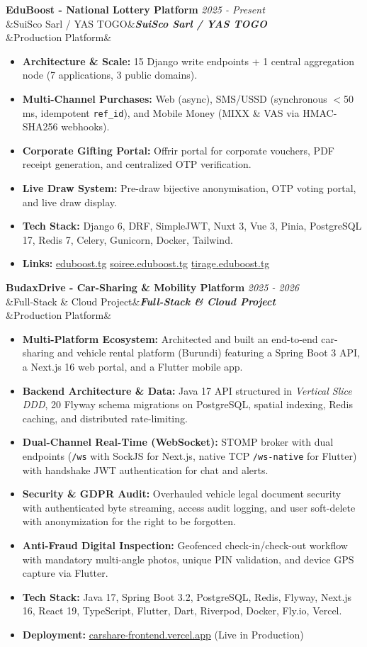 \documentclass[11pt, a4paper]{article}
\newcommand{\cventry}[4]{%
  \needspace{3\baselineskip}%
  \noindent\textbf{\large #1} \hfill {\small\color{secondary}\textit{#2}}\\[2pt]%
  \ifx&#3&\else\noindent\textbf{\textit{#3}}\\[3pt]\fi
  \ifx&#4&\else\noindent{#4}\fi
  \vspace{6pt}\par
}
\begin{document}
\cventry{EduBoost - National Lottery Platform}{2025 - Present}{SuiSco Sarl / YAS TOGO}{Production Platform}
\begin{itemize}
  \item \textbf{Architecture \& Scale:} 15 Django write endpoints + 1 central aggregation node (7 applications, 3 public domains).
  \item \textbf{Multi-Channel Purchases:} Web (async), SMS/USSD (synchronous $<$50 ms, idempotent \texttt{ref\_id}), and Mobile Money (MIXX \& VAS via HMAC-SHA256 webhooks).
  \item \textbf{Corporate Gifting Portal:} Offrir portal for corporate vouchers, PDF receipt generation, and centralized OTP verification.
  \item \textbf{Live Draw System:} Pre-draw bijective anonymisation, OTP voting portal, and live draw display.
  \item \textbf{Tech Stack:} Django 6, DRF, SimpleJWT, Nuxt 3, Vue 3, Pinia, PostgreSQL 17, Redis 7, Celery, Gunicorn, Docker, Tailwind.
  \item \textbf{Links:} \href{https://www.eduboost.tg}{eduboost.tg} \quad\textbullet\quad \href{https://soiree.eduboost.tg}{soiree.eduboost.tg} \quad\textbullet\quad \href{https://tirage.eduboost.tg}{tirage.eduboost.tg}
\end{itemize}

\vspace{4pt}

\cventry{BudaxDrive - Car-Sharing \& Mobility Platform}{2025 - 2026}{Full-Stack \& Cloud Project}{Production Platform}
\begin{itemize}
  \item \textbf{Multi-Platform Ecosystem:} Architected and built an end-to-end car-sharing and vehicle rental platform (Burundi) featuring a Spring Boot 3 API, a Next.js 16 web portal, and a Flutter mobile app.
  \item \textbf{Backend Architecture \& Data:} Java 17 API structured in \textit{Vertical Slice DDD}, 20 Flyway schema migrations on PostgreSQL, spatial indexing, Redis caching, and distributed rate-limiting.
  \item \textbf{Dual-Channel Real-Time (WebSocket):} STOMP broker with dual endpoints (\texttt{/ws} with SockJS for Next.js, native TCP \texttt{/ws-native} for Flutter) with handshake JWT authentication for chat and alerts.
  \item \textbf{Security \& GDPR Audit:} Overhauled vehicle legal document security with authenticated byte streaming, access audit logging, and user soft-delete with anonymization for the right to be forgotten.
  \item \textbf{Anti-Fraud Digital Inspection:} Geofenced check-in/check-out workflow with mandatory multi-angle photos, unique PIN validation, and device GPS capture via Flutter.
  \item \textbf{Tech Stack:} Java 17, Spring Boot 3.2, PostgreSQL, Redis, Flyway, Next.js 16, React 19, TypeScript, Flutter, Dart, Riverpod, Docker, Fly.io, Vercel.
  \item \textbf{Deployment:} \href{https://carshare-frontend.vercel.app/}{carshare-frontend.vercel.app} (Live in Production)
\end{itemize}
\end{document}
